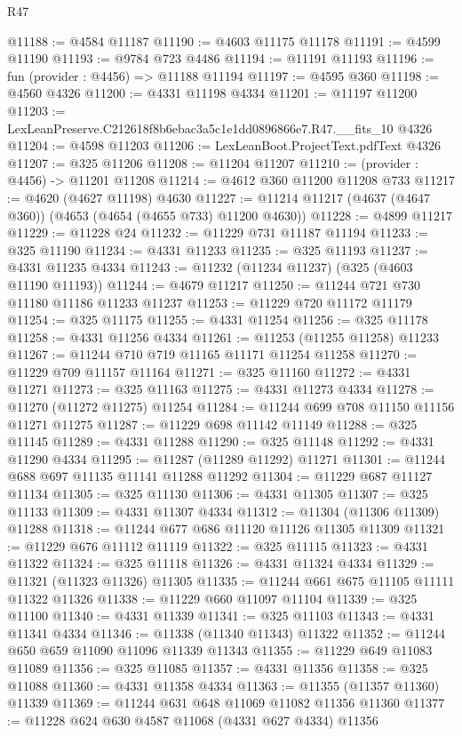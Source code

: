 \begin{lexlean}{R47}
\begin{coremodule}
@11188 := @4584 @11187
@11190 := @4603 @11175 @11178
@11191 := @4599 @11190
@11193 := @9784 @723 @4486
@11194 := @11191 @11193
@11196 := fun (provider : @4456) => @11188 @11194
@11197 := @4595 @360
@11198 := @4560 @4326
@11200 := @4331 @11198 @4334
@11201 := @11197 @11200
@11203 := LexLeanPreserve.C212618f8b6ebac3a5c1e1dd0896866e7.R47.__fits_10 @4326
@11204 := @4598 @11203
@11206 := LexLeanBoot.ProjectText.pdfText @4326
@11207 := @325 @11206
@11208 := @11204 @11207
@11210 := (provider : @4456) -> @11201 @11208
@11214 := @4612 @360 @11200 @11208 @733
@11217 := @4620 (@4627 @11198) @4630
@11227 := @11214 @11217 (@4637 (@4647 @360)) (@4653 (@4654 (@4655 @733) @11200 @4630))
@11228 := @4899 @11217
@11229 := @11228 @24
@11232 := @11229 @731 @11187 @11194
@11233 := @325 @11190
@11234 := @4331 @11233
@11235 := @325 @11193
@11237 := @4331 @11235 @4334
@11243 := @11232 (@11234 @11237) (@325 (@4603 @11190 @11193))
@11244 := @4679 @11217
@11250 := @11244 @721 @730 @11180 @11186 @11233 @11237
@11253 := @11229 @720 @11172 @11179
@11254 := @325 @11175
@11255 := @4331 @11254
@11256 := @325 @11178
@11258 := @4331 @11256 @4334
@11261 := @11253 (@11255 @11258) @11233
@11267 := @11244 @710 @719 @11165 @11171 @11254 @11258
@11270 := @11229 @709 @11157 @11164
@11271 := @325 @11160
@11272 := @4331 @11271
@11273 := @325 @11163
@11275 := @4331 @11273 @4334
@11278 := @11270 (@11272 @11275) @11254
@11284 := @11244 @699 @708 @11150 @11156 @11271 @11275
@11287 := @11229 @698 @11142 @11149
@11288 := @325 @11145
@11289 := @4331 @11288
@11290 := @325 @11148
@11292 := @4331 @11290 @4334
@11295 := @11287 (@11289 @11292) @11271
@11301 := @11244 @688 @697 @11135 @11141 @11288 @11292
@11304 := @11229 @687 @11127 @11134
@11305 := @325 @11130
@11306 := @4331 @11305
@11307 := @325 @11133
@11309 := @4331 @11307 @4334
@11312 := @11304 (@11306 @11309) @11288
@11318 := @11244 @677 @686 @11120 @11126 @11305 @11309
@11321 := @11229 @676 @11112 @11119
@11322 := @325 @11115
@11323 := @4331 @11322
@11324 := @325 @11118
@11326 := @4331 @11324 @4334
@11329 := @11321 (@11323 @11326) @11305
@11335 := @11244 @661 @675 @11105 @11111 @11322 @11326
@11338 := @11229 @660 @11097 @11104
@11339 := @325 @11100
@11340 := @4331 @11339
@11341 := @325 @11103
@11343 := @4331 @11341 @4334
@11346 := @11338 (@11340 @11343) @11322
@11352 := @11244 @650 @659 @11090 @11096 @11339 @11343
@11355 := @11229 @649 @11083 @11089
@11356 := @325 @11085
@11357 := @4331 @11356
@11358 := @325 @11088
@11360 := @4331 @11358 @4334
@11363 := @11355 (@11357 @11360) @11339
@11369 := @11244 @631 @648 @11069 @11082 @11356 @11360
@11377 := @11228 @624 @630 @4587 @11068 (@4331 @627 @4334) @11356

\end{coremodule}
\end{lexlean}
